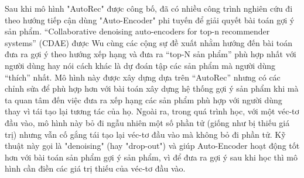 
Sau khi mô hình "AutoRec" được công bố, đã có nhiều công trình nghiên cứu đi theo hướng tiếp cận dùng "Auto-Encoder" phi tuyến để giải quyết bài toán gợi ý sản phẩm. 
``Collaborative denoising auto-encoders for top-n recommender systems'' \cite{cdae} (CDAE) được Wu cùng các cộng sự đề xuất nhằm hướng đến bài toán đưa ra gợi ý theo hướng xếp hạng và đưa ra ``top-N sản phẩm'' phù hợp nhất với người dùng hay nói cách khác là dự đoán tập các sản phẩm mà người dùng ``thích'' nhất. 
Mô hình này được xây dựng dựa trên ``AutoRec'' nhưng có các chỉnh sửa để phù hợp hơn với bài toán xây dựng hệ thống gợi ý sản phẩm khi mà ta quan tâm đến việc đưa ra xếp hạng các sản phẩm phù hợp với người dùng thay vì tái tạo lại tương tác của họ. 
Ngoài ra, trong quá trình học, với một véc-tơ đầu vào, mô hình này bỏ đi ngẫu nhiên một số phần tử (giống như bị thiếu giá trị) nhưng vẫn cố gắng tái tạo lại véc-tơ đầu vào mà không bỏ đi phần tử. 
Kỹ thuật này gọi là "denoising" (hay "drop-out") và giúp Auto-Encoder hoạt động tốt hơn với bài toán sản phẩm gợi ý sản phẩm, vì để đưa ra gợi ý sau khi học thì mô hình cần điền các giá trị thiếu của véc-tơ đầu vào.

